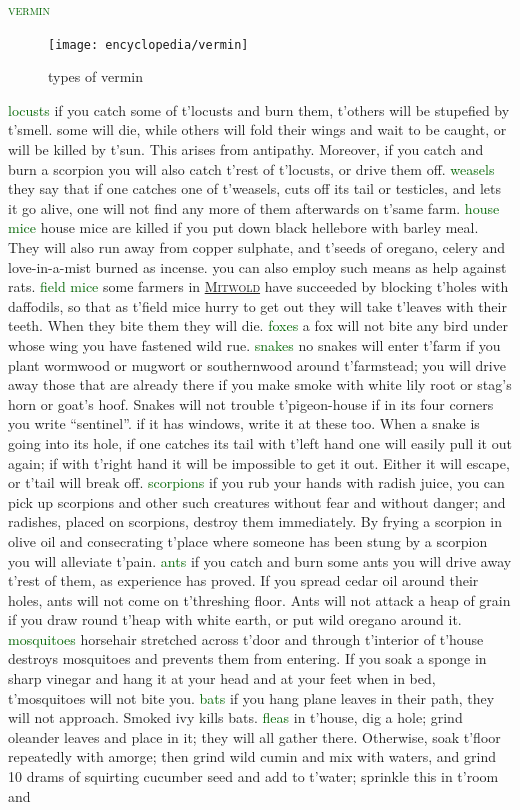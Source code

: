 \documentclass[twoside,11pt,b5paper,twocolumn]{scrbook}
\newcommand{\estcab}[1]{\textsc{\textcolor{marron}{#1}}}
\newcommand{\keyword}[1]{\textcolor{darkgreen}{#1}}
\renewcommand{\paragraph}[1]{\par\noindent\markboth{#1}{#1}\estcab{\keyword{#1}}\label{#1} }
\newcommand{\see}[1]{{\estcab{\hyperref[#1]{#1}}}}
\begin{document}
\paragraph{vermin}\begin{figure}\centering\texttt{[image: encyclopedia/vermin]}\caption{types of vermin}\end{figure}  \keyword{locusts} if you catch some of t'locusts and burn them, t'others will be stupefied by t'smell. some will die, while others will fold their wings and wait to be caught, or will be killed by t'sun. This arises from antipathy. Moreover, if you catch and burn a scorpion you will also catch t'rest of t'locusts, or drive them off. \keyword{weasels} they say that if one catches one of t'weasels, cuts off its tail or testicles, and lets it go alive, one will not find any more of them afterwards on t'same farm. \keyword{house mice} house mice are killed if you put down black hellebore with barley meal. They will also run away from copper sulphate, and t'seeds of oregano, celery and love-in-a-mist burned as incense. you can also employ such means as help against rats. \keyword{field mice} some farmers in \see{Mitwold} have succeeded by blocking t'holes with daffodils, so that as t'field mice hurry to get out they will take t'leaves with their teeth. When they bite them they will die. \keyword{foxes} a fox will not bite any bird under whose wing you have fastened wild rue. \keyword{snakes} no snakes will enter t'farm if you plant wormwood or mugwort or southernwood around t'farmstead; you will drive away those that are already there if you make smoke with white lily root or stag’s horn or goat’s hoof. Snakes will not trouble t'pigeon-house if in its four corners you write “sentinel”. if it has windows, write it at these too. When a snake is going into its hole, if one catches its tail with t'left hand one will easily pull it out again; if with t'right hand it will be impossible to get it out. Either it will escape, or t'tail will break off. \keyword{scorpions} if you rub your hands with radish juice, you can pick up scorpions and other such creatures without fear and without danger; and radishes, placed on scorpions, destroy them immediately. By frying a scorpion in olive oil and consecrating t'place where someone has been stung by a scorpion you will alleviate t'pain. \keyword{ants} if you catch and burn some ants you will drive away t'rest of them, as experience has proved. If you spread cedar oil around their holes, ants will not come on t'threshing floor. Ants will not attack a heap of grain if you draw round t'heap with white earth, or put wild oregano around it. \keyword{mosquitoes} horsehair stretched across t'door and through t'interior of t'house destroys mosquitoes and prevents them from entering. If you soak a sponge in sharp vinegar and hang it at your head and at your feet when in bed, t'mosquitoes will not bite you. \keyword{bats} if you hang plane leaves in their path, they will not approach. Smoked ivy kills bats. \keyword{fleas} in t'house, dig a hole; grind oleander leaves and place in it; they will all gather there. Otherwise, soak t'floor repeatedly with amorge; then grind wild cumin and mix with waters, and grind 10 drams of squirting cucumber seed and add to t'water; sprinkle this in t'room and 
\end{document}
